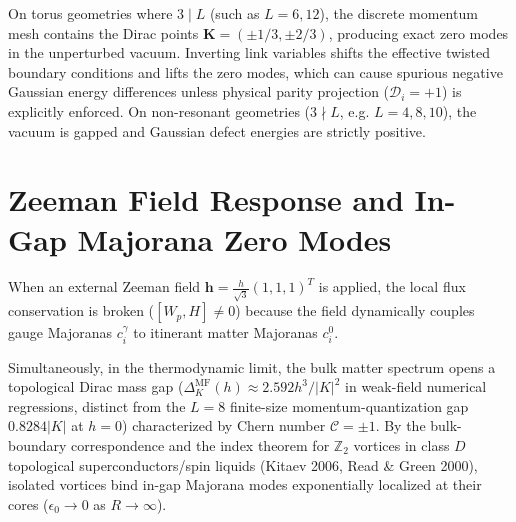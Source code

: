 \begin{remark}
\label{rem:m1_10_dirac_commensurability}
On torus geometries where $3 \mid L$ (such as $L = 6, 12$), the discrete momentum mesh contains the Dirac points $\mathbf{K} = (\pm 1/3, \pm 2/3)$, producing exact zero modes in the unperturbed vacuum. Inverting link variables shifts the effective twisted boundary conditions and lifts the zero modes, which can cause spurious negative Gaussian energy differences unless physical parity projection ($\mathcal{D}_i = +1$) is explicitly enforced. On non-resonant geometries ($3 \nmid L$, e.g. $L = 4, 8, 10$), the vacuum is gapped and Gaussian defect energies are strictly positive.
\end{remark}

\section{Zeeman Field Response and In-Gap Majorana Zero Modes}
\label{sec:vortex_zero_modes}

When an external Zeeman field $\mathbf{h} = \frac{h}{\sqrt{3}}(1, 1, 1)^T$ is applied, the local flux conservation is broken ($[W_p, H] \ne 0$) because the field dynamically couples gauge Majoranas $c_i^\gamma$ to itinerant matter Majoranas $c_i^0$. 

Simultaneously, in the thermodynamic limit, the bulk matter spectrum opens a topological Dirac mass gap ($\Delta_K^{\mathrm{MF}}(h) \approx 2.592 h^3/|K|^2$ in weak-field numerical regressions, distinct from the $L=8$ finite-size momentum-quantization gap $0.8284|K|$ at $h=0$) characterized by Chern number $\mathcal{C} = \pm 1$. By the bulk-boundary correspondence and the index theorem for $\mathbb{Z}_2$ vortices in class $D$ topological superconductors/spin liquids (Kitaev 2006, Read \& Green 2000), isolated vortices bind in-gap Majorana modes exponentially localized at their cores ($\epsilon_0 \to 0$ as $R \to \infty$).

